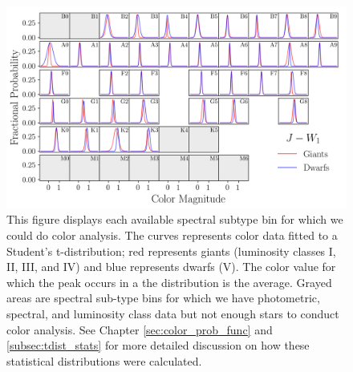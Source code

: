 \begin{figure}
    \centering
    \includegraphics[width=1.0\textwidth,clip=true]{Figures/periodic/periodic-t-pdf_J_W1.png}
    \caption{This figure displays each available spectral subtype bin for which we could do color analysis. The curves represents color data fitted to a Student's t-distribution; red represents giants (luminosity classes I, II, III, and IV) and blue represents dwarfs (V). The color value for which the peak occurs in a the distribution is the average. Grayed areas are spectral sub-type bins for which we have photometric, spectral, and luminosity class data but not enough stars to conduct color analysis. See Chapter \ref{sec:color_prob_func} and \ref{subsec:tdist_stats} for more detailed discussion on how these statistical distributions were calculated.}
    \label{fig:periodic-pdf-jw1}
\end{figure}


